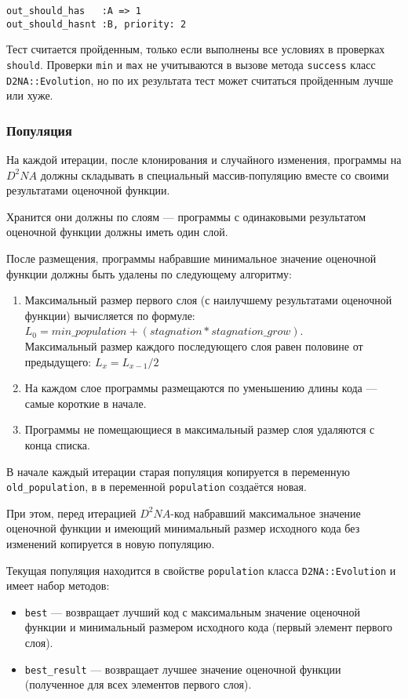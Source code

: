 \documentclass[utf8,a5paper,portrait,12pt]{eskdtext}
\begin{document}
\begin{verbatim}
out_should_has   :A => 1
out_should_hasnt :B, priority: 2
\end{verbatim}

Тест считается пройденным, только если выполнены все условиях в проверках
\texttt{should}. Проверки \texttt{min} и \texttt{max} не учитываются в вызове
метода \texttt{success} класс \texttt{D2NA::Evolution}, но по их результата
тест может считаться пройденным лучше или хуже.

\subsubsection{Популяция}

На каждой итерации, после клонирования и случайного изменения, программы на
$D^2NA$ должны складывать в специальный массив-популяцию вместе со своими
результатами оценочной функции.

Хранится они должны по слоям — программы с одинаковыми результатом оценочной
функции должны иметь один слой.

После размещения, программы набравшие минимальное значение оценочной функции
должны быть удалены по следующему алгоритму:

\begin{enumerate}
  \item Максимальный размер первого слоя (с наилучшему результатами оценочной
        функции) вычисляется по формуле:\\
        $L_0 = min\_population + (stagnation * stagnation\_grow)$.\\
        Максимальный размер каждого последующего слоя равен половине от
        предыдущего: $L_{x} = L_{x-1} / 2$
  \item На каждом слое программы размещаются по уменьшению длины кода — самые
        короткие в начале.
  \item Программы не помещающиеся в максимальный размер слоя удаляются с конца
        списка.
\end{enumerate}

В начале каждый итерации старая популяция копируется в переменную
\texttt{old\_population}, в в переменной \texttt{population} создаётся новая.

При этом, перед итерацией $D^2NA$-код набравший максимальное значение оценочной
функции и имеющий минимальный размер исходного кода без изменений копируется
в новую популяцию.

Текущая популяция находится в свойстве \texttt{population} класса
\texttt{D2NA::Evolution} и имеет набор методов:
\begin{itemize}
  \item \texttt{best} — возвращает лучший код с максимальным значение оценочной
        функции и минимальный размером исходного кода (первый элемент первого
        слоя).
  \item \texttt{best\_result} — возвращает лучшее значение оценочной функции
        (полученное для всех элементов первого слоя).
\end{itemize}
\end{document}

